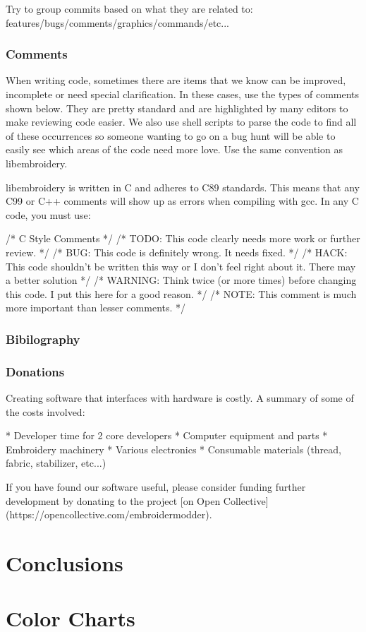 \documentclass[a4paper, 11pt]{report}
\begin{document}
Try to group commits based on what they are related to: features/bugs/comments/graphics/commands/etc...

\subsection{Comments}

When writing code, sometimes there are items that we know can be improved,
incomplete or need special clarification. In these cases, use the types of
comments shown below. They are pretty standard and are highlighted by many editors to
make reviewing code easier. We also use shell scripts to parse the code to find
all of these occurrences so someone wanting to go on a bug hunt will be able to
easily see which areas of the code need more love. Use the same convention
as libembroidery.

libembroidery is written in C and adheres to C89 standards. This means
that any C99 or C++ comments will show up as errors when compiling with
gcc. In any C code, you must use:

    /* C Style Comments */
    /* TODO: This code clearly needs more work or further review. */
    /* BUG: This code is definitely wrong. It needs fixed. */
    /* HACK: This code shouldn't be written this way or I don't feel right about it. There may a better solution */
    /* WARNING: Think twice (or more times) before changing this code. I put this here for a good reason. */
    /* NOTE: This comment is much more important than lesser comments. */

    \subsection{Bibilography}


    \subsection{Donations}

Creating software that interfaces with hardware is costly. A summary of some of the costs involved:
                    
  * Developer time for 2 core developers
  * Computer equipment and parts
  * Embroidery machinery
  * Various electronics
  * Consumable materials (thread, fabric, stabilizer, etc...)

If you have found our software useful, please consider funding further development by donating to the project [on Open Collective](https://opencollective.com/embroidermodder).

\chapter{Conclusions}




\appendix



\chapter{Color Charts}
\end{document}
